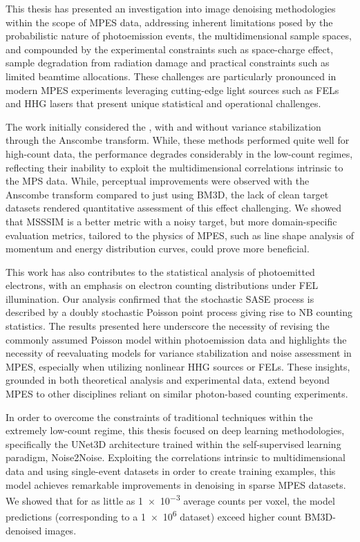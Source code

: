This thesis has presented an investigation into image denoising methodologies within the scope of \gls{MPES} data, addressing inherent limitations posed by the probabilistic nature of photoemission events, the multidimensional sample spaces, and compounded by the experimental constraints such as space-charge effect, sample degradation from radiation damage and practical constraints such as limited  beamtime allocations. These challenges are particularly pronounced in modern \gls{MPES} experiments leveraging cutting-edge light sources such as \glspl{FEL} and \gls{HHG} lasers that present unique statistical and operational challenges.

The work initially considered the , with and without variance stabilization through the Anscombe transform. While, these methods performed quite well for high-count data, the performance degrades considerably in the low-count regimes, reflecting their inability to exploit the multidimensional correlations intrinsic to the MPS data. While, perceptual improvements were observed with the Anscombe transform compared to just using \gls{BM3D}, the lack of clean target datasets rendered quantitative assessment of this effect challenging. We showed that \gls{MSSSIM} is a better metric with a noisy target, but more domain-specific evaluation metrics, tailored to the physics of \gls{MPES}, such as line shape analysis of momentum and energy distribution curves, could prove more beneficial.

This work has also contributes to the statistical analysis of photoemitted electrons, with an emphasis on electron counting distributions under FEL illumination. Our analysis confirmed that the stochastic SASE process is described by a doubly stochastic Poisson point process giving rise to NB counting statistics. The results presented here underscore the necessity of revising the commonly assumed Poisson model  within photoemission data and highlights the necessity of reevaluating models for variance stabilization and noise assessment in \gls{MPES}, especially when utilizing nonlinear \gls{HHG} sources or \glspl{FEL}. These insights, grounded in both theoretical analysis and experimental data, extend beyond \gls{MPES} to other disciplines reliant on similar photon-based counting experiments.

In order to overcome the constraints of traditional techniques within the extremely low-count regime, this thesis focused on deep learning methodologies, specifically the UNet3D architecture trained within the self-supervised learning paradigm, Noise2Noise. Exploiting the  correlations intrinsic to multidimensional data and using single-event datasets in order to create training examples, this model achieves  remarkable improvements in denoising in sparse \gls{MPES} datasets. We showed that for as little as \num{1e-3} average counts per voxel, the model predictions (corresponding to a \num{1e6} dataset) exceed higher count \gls{BM3D}-denoised images.

